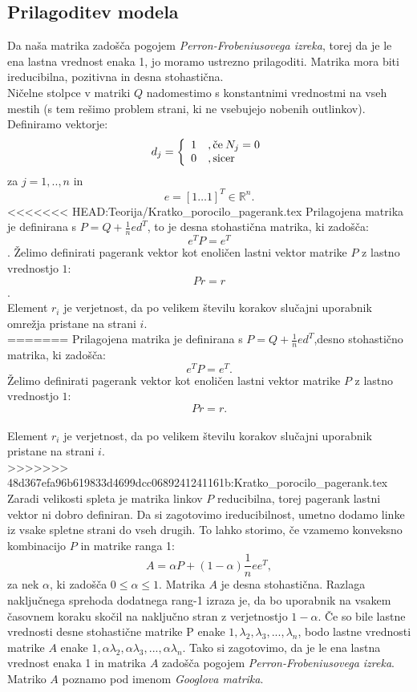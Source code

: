 \documentclass[a4paper]{article}
\begin{document}
\subsection{Prilagoditev modela}\hspace{4.8mm} Da naša matrika zadošča pogojem \textit{Perron-Frobeniusovega izreka}, torej da je le ena lastna vrednost enaka 1, jo moramo ustrezno prilagoditi. Matrika mora biti ireducibilna, pozitivna in desna stohastična.\\
 Ničelne stolpce v matriki $Q$ nadomestimo s konstantnimi vrednostmi na vseh mestih (s tem rešimo problem strani, ki ne vsebujejo nobenih outlinkov). 
\\Definiramo vektorje: \\
\[
d_j = 
\left \{
	\begin{array}{ll}
		1  &, \mbox{če}\hspace{0.8mm} N_j = 0 \\
		0 &, \mbox{sicer} 
	\end{array}
\right. \]
za $j = 1, .., n$ in
$$e = [1 … 1] ^T \in \mathbb{R}^n.$$
<<<<<<< HEAD:Teorija/Kratko_porocilo_pagerank.tex
Prilagojena matrika je definirana s $ P = Q + \frac{1}{n}ed^T$, to je desna stohastična matrika, ki zadošča:
$$e^TP = e^T$$.
Želimo definirati pagerank vektor kot enoličen lastni vektor matrike $P$ z lastno vrednostjo $1$:
$$Pr=r$$. \\
Element $r_i$ je verjetnost, da po velikem številu korakov slučajni uporabnik omrežja pristane na strani $i$.\\
=======
Prilagojena matrika je definirana s $ P = Q + \frac{1}{n}ed^T$,desno stohastično matrika, ki zadošča:
$$e^TP = e^T.$$
Želimo definirati pagerank vektor kot enoličen lastni vektor matrike $P$ z lastno vrednostjo $1$:
$$Pr=r.$$\\
Element $r_i$ je verjetnost, da po velikem številu korakov slučajni uporabnik pristane na strani $i$.\\
>>>>>>> 48d367efa96b619833d4699dcc0689241241161b:Kratko_porocilo_pagerank.tex
Zaradi velikosti spleta je matrika linkov $P$ reducibilna, torej pagerank lastni vektor ni dobro definiran. Da si zagotovimo ireducibilnost, umetno dodamo linke iz vsake spletne strani do vseh drugih. To lahko storimo, če vzamemo konveksno kombinacijo $P$ in matrike ranga 1:
$$A=\alpha P + (1-\alpha)\frac{1}{n}ee^T,$$
za nek $\alpha$, ki zadošča $0 \leq \alpha \leq 1$. Matrika $A$ je desna stohastična. Razlaga naključnega sprehoda dodatnega rang-1 izraza je, da bo uporabnik na vsakem časovnem koraku skočil na naključno stran z verjetnostjo $1- \alpha$. Če so bile lastne vrednosti desne stohastične matrike P enake $1, \lambda_2, \lambda_3, ... , \lambda_n$, bodo lastne vrednosti matrike $A$ enake $1, \alpha \lambda_2, \alpha \lambda_3, ... , \alpha \lambda_n$. Tako si zagotovimo, da je le ena lastna vrednost enaka 1 in matrika $A$ zadošča pogojem \textit{Perron-Frobeniusovega izreka}. Matriko $A$ poznamo pod imenom \textit{Googlova matrika}.
\end{document}
